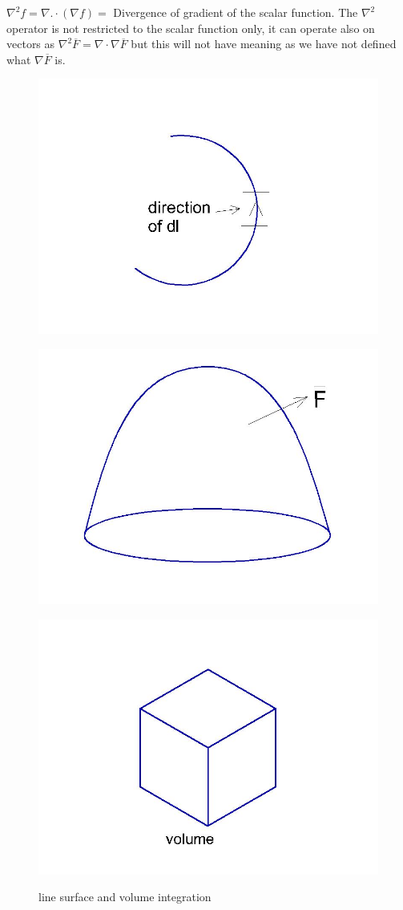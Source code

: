 $\nabla^2 f= \nabla .\cdot (\nabla f) =$ Divergence of gradient of the scalar function. The $\nabla^2 $ operator is not restricted to the scalar function only, it can operate also on vectors as $\nabla^2 \overline{F} = \nabla \cdot \nabla \overline{F}$ but this will not have meaning as we have not defined what $\nabla \overline{F}$ is.
\begin{figure}[h]
\centering
\begin{minipage}{.25\textwidth}
\centering
\includegraphics[width=.4\linewidth]{./graphics/fig173}
\label{fig:fig173}
\end{minipage}%
\begin{minipage}{.25\textwidth}
\centering
\includegraphics[width=.4\linewidth]{./graphics/fig173b}
\label{fig:fig173b}
\end{minipage}
\begin{minipage}{.5\textwidth}
\centering
\includegraphics[width=.4\linewidth]{./graphics/fig173c}
\label{fig:fig173c}
\end{minipage}%
\caption{line surface and volume integration}
\end{figure}


